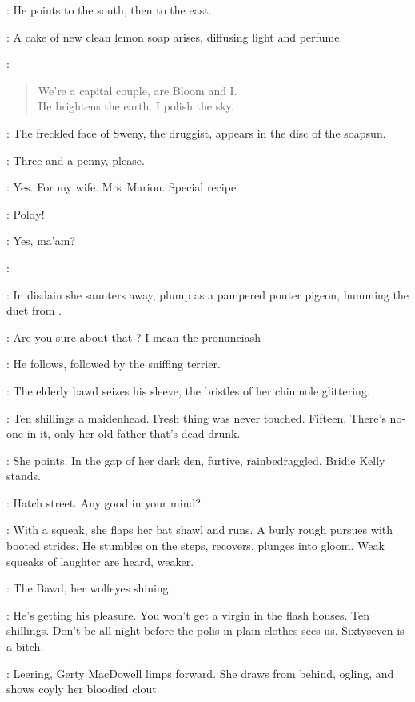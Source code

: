 :
He points to the south, then to the east.

:
A cake of new clean lemon soap arises, diffusing light and perfume.

\Soap:
\begin{verse}
    We're a capital couple, are Bloom and I.\\
    He brightens the earth. I polish the sky.
\end{verse}

:
The freckled face of Sweny, the druggist,
appears in the disc of the soapsun.

\Sweny:
Three and a penny, please.

\Bloom:
Yes. For my wife.
Mrs~Marion. Special recipe.

\Marion:
 Poldy!

\Bloom:
Yes, ma'am?

\Marion:

:
In disdain she saunters away, plump as a pampered pouter pigeon,
humming the duet from .

\Bloom:
Are you sure about that ?
I mean the pronunciash---

:
He follows, followed by the sniffing terrier.

:
The elderly bawd seizes his sleeve,
the bristles of her chinmole glittering.

\Bawd:
Ten shillings a maidenhead.
Fresh thing was never touched. Fifteen.
There's no-one in it,
only her old father that's dead drunk.

:
She points.
In the gap of her dark den,
furtive, rainbedraggled, Bridie Kelly stands.

\Bridie:
Hatch street.
Any good in your mind?

:
With a squeak, she flaps her bat shawl and runs.
A burly rough pursues with booted strides.
He stumbles on the steps, recovers, plunges into gloom.
Weak squeaks of laughter are heard, weaker.

:
The Bawd, her wolfeyes shining.

\Bawd:
He's getting his pleasure.
You won't get a virgin in the flash houses.
Ten shillings.
Don't be all night before the polis in plain clothes sees us.
Sixtyseven is a bitch.

:
Leering, Gerty MacDowell limps forward.
She draws from behind, ogling,
and shows coyly her bloodied clout.

